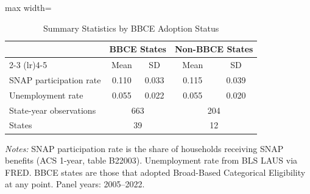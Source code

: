
\begin{table}[H]
\centering
\caption{Summary Statistics by BBCE Adoption Status}
\label{tab:summary}
\begin{adjustbox}{max width=\textwidth}
\begin{threeparttable}
\begin{tabular}{lcccc}
\toprule
& \multicolumn{2}{c}{BBCE States} & \multicolumn{2}{c}{Non-BBCE States} \\
\cmidrule(lr){2-3} \cmidrule(lr){4-5}
& Mean & SD & Mean & SD \\
\midrule
SNAP participation rate & 0.110 & 0.033 & 0.115 & 0.039 \\
Unemployment rate & 0.055 & 0.022 & 0.055 & 0.020 \\[4pt]
State-year observations & \multicolumn{2}{c}{663} & \multicolumn{2}{c}{204} \\
States & \multicolumn{2}{c}{39} & \multicolumn{2}{c}{12} \\
\bottomrule
\end{tabular}
\begin{tablenotes}[flushleft]
\small
\item \textit{Notes:} SNAP participation rate is the share of households receiving SNAP benefits (ACS 1-year, table B22003). Unemployment rate from BLS LAUS via FRED. BBCE states are those that adopted Broad-Based Categorical Eligibility at any point. Panel years: 2005--2022.
\end{tablenotes}
\end{threeparttable}
\end{adjustbox}
\end{table}

